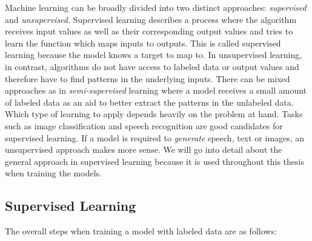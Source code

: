 \documentclass[final]{vutinfth} %
\begin{document}
Machine learning can be broadly divided into two distinct approaches:
\emph{supervised} and \emph{unsupervised}. Supervised learning
describes a process where the algorithm receives input values as well
as their corresponding output values and tries to learn the function
which maps inputs to outputs. This is called supervised learning
because the model knows a target to map to. In unsupervised learning,
in contrast, algorithms do not have access to labeled data or output
values and therefore have to find patterns in the underlying
inputs. There can be mixed approaches as in \emph{semi-supervised}
learning where a model receives a small amount of labeled data as an
aid to better extract the patterns in the unlabeled data. Which type
of learning to apply depends heavily on the problem at hand. Tasks
such as image classification and speech recognition are good
candidates for supervised learning. If a model is required to
\emph{generate} speech, text or images, an unsupervised approach makes
more sense. We will go into detail about the general approach in
supervised learning because it is used throughout this thesis when
training the models.

\subsection{Supervised Learning}
\label{ssec:theory-sl}

The overall steps when training a model with labeled data are as
follows:
\end{document}
